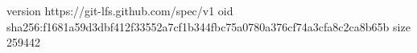 version https://git-lfs.github.com/spec/v1
oid sha256:f1681a59d3dbf412f33552a7cf1b344fbc75a0780a376cf74a3cfa8c2ca8b65b
size 259442
